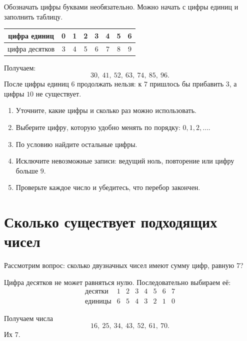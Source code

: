 Обозначать цифры буквами необязательно. Можно начать с цифры единиц и
заполнить таблицу.

\begin{center}
\renewcommand{\arraystretch}{1.35}
\begin{tabular}{c|ccccccc}
  \toprule
  цифра единиц & 0 & 1 & 2 & 3 & 4 & 5 & 6 \\
  \midrule
  цифра десятков & 3 & 4 & 5 & 6 & 7 & 8 & 9 \\
  \bottomrule
\end{tabular}
\end{center}

Получаем:
\[
  \boxed{30,\ 41,\ 52,\ 63,\ 74,\ 85,\ 96}.
\]
После цифры единиц \(6\) продолжать нельзя: к \(7\) пришлось бы прибавить
\(3\), а цифры \(10\) не существует.

\systematicroutefigure

\begin{conclusionbox}
  \begin{enumerate}
    \item Уточните, какие цифры и сколько раз можно использовать.
    \item Выберите цифру, которую удобно менять по порядку: \(0,1,2,\ldots\).
    \item По условию найдите остальные цифры.
    \item Исключите невозможные записи: ведущий ноль, повторение или цифру
      больше \(9\).
    \item Проверьте каждое число и убедитесь, что перебор закончен.
  \end{enumerate}
\end{conclusionbox}

\section{Сколько существует подходящих чисел}

Рассмотрим вопрос: сколько двузначных чисел имеют сумму цифр, равную \(7\)?

Цифра десятков не может равняться нулю. Последовательно выбираем её:
\[
\begin{array}{c|ccccccc}
  \text{десятки} & 1&2&3&4&5&6&7\\
  \hline
  \text{единицы} & 6&5&4&3&2&1&0
\end{array}
\]

Получаем числа
\[
  16,\ 25,\ 34,\ 43,\ 52,\ 61,\ 70.
\]
Их \(7\).

\placevaluecountfigure

